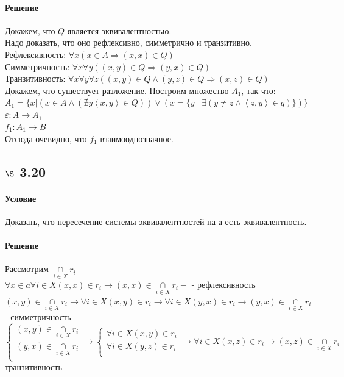 \documentclass[a4paper,12pt]{article}
\DeclareMathOperator*{\mycap}{\cap}
\begin{document}
\paragraph*{Решение}
Докажем, что $ Q $ является эквивалентностью.\\
Надо доказать, что оно рефлексивно, симметрично и транзитивно.\\
Рефлексивность: $ \forall x ( x \in A \Rightarrow (x,x) \in Q )$\\
Симметричность: $ \forall x \forall y ((x, y) \in Q \Rightarrow (y, x) \in Q)$\\
Транзитивность: $ \forall x \forall y \forall z ((x, y) \in Q \wedge (y, z) \in Q \Rightarrow (x, z) \in Q)$\\
Докажем, что сушествует разложение. Построим множество $A_1$, так что:\\
$ A_1 = \{  x | (x \in A \wedge ( \nexists y \left\langle x, y \right\rangle \in Q ) ) \vee ( x = \{ y \mid \exists ( y \neq z \wedge \left\langle z, y \right\rangle \in q )  \} ) \} $\\
$  \varepsilon : A \rightarrow A_1 $\\
$ f_1: A_1 \rightarrow B$\\
Отсюда очевидно, что $ f_1 $ взаимооднозначное.
 
\subsection*{$\S$ 3.20}
\paragraph*{Условие}
Доказать, что пересечение системы эквивалентностей на а есть эквивалентность.
\paragraph*{Решение}
Рассмотрим $\mycap\limits_{i \in X} r_i $\\
$\forall x \in a  \forall i \in X (x,x) \in r_i \rightarrow (x,x) \in \mycap\limits_{i \in X} r_i -$ - рефлексивность\\
$(x,y) \in \mycap\limits_{i \in X} r_i \rightarrow \forall i \in X (x,y) \in r_i \rightarrow \forall i \in X (y,x) \in r_i \rightarrow (y,x) \in \mycap\limits_{i \in X} r_i$ - симметричность\\
\begin{equation*}
\begin{cases} 
(x,y) \in  \mycap\limits_{i \in X} r_i \\
(y,x) \in  \mycap\limits_{i \in X} r_i \\
\end{cases} \rightarrow
\begin{cases} 
\forall i \in X (x,y) \in   r_i \\
\forall i \in X (y,z) \in   r_i \\
\end{cases} 
\rightarrow
\forall i \in X (x,z) \in r_i \rightarrow (x,z) \in \mycap\limits_{i \in X} r_i
\end{equation*}
транзитивность
\end{document}
